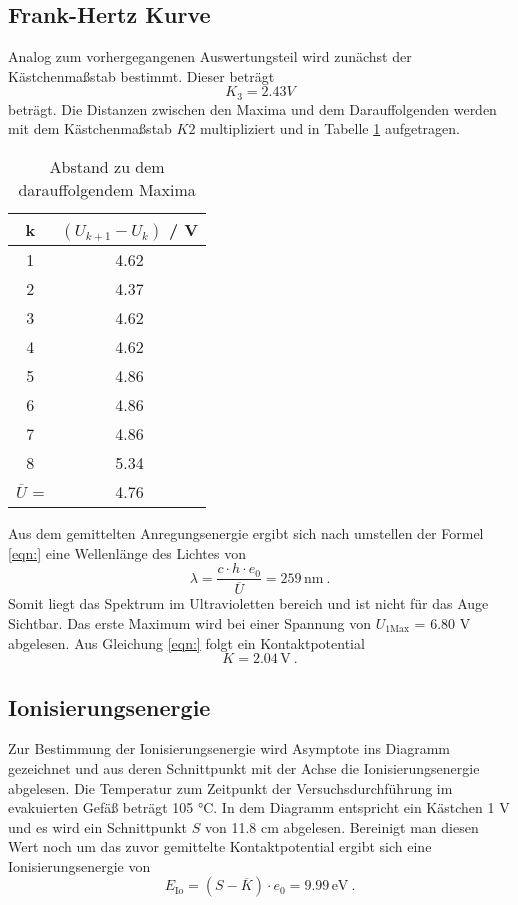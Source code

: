 \subsection{Frank-Hertz Kurve}
Analog zum vorhergegangenen Auswertungsteil wird zunächst der Kästchenmaßstab bestimmt. Dieser beträgt
\begin{equation}
  K_3 = 2.43 V
  \label{eqn:K3}
\end{equation}
beträgt. Die Distanzen zwischen den Maxima und dem Darauffolgenden werden mit dem Kästchenmaßstab $K2$ multipliziert und in Tabelle \ref{tab:Max} aufgetragen.
\begin{table}
  \centering
  \begin{tabular}{c c}
    \toprule
    	k & $(U_{k+1} - U_k)$ / V \\
    \midrule
    	1 & 4.62	\\
    	2 & 4.37	\\
    	3 & 4.62	\\
    	4 & 4.62	\\
    	5 & 4.86	\\
    	6 & 4.86	\\
    	7 & 4.86	\\
    	8 & 5.34	\\
    \midrule
    	$\overline{U}$  = & 4.76 \\
    \bottomrule
  \end{tabular}
  \caption{Abstand zu dem darauffolgendem Maxima}
  \label{tab:Max}
\end{table}
Aus dem gemittelten Anregungsenergie ergibt sich nach umstellen der Formel \ref{eqn:} eine Wellenlänge des Lichtes von
\begin{equation}
  \lambda = \frac{c \cdot h \cdot e_0}{\overline{U}} = 259 \, \text{nm} \ .
  \label{eqn:spek}
\end{equation}
Somit liegt das Spektrum im Ultravioletten bereich und ist nicht für das Auge Sichtbar. Das erste Maximum wird bei einer Spannung von $U_{1 \text{Max}}$ = 6.80 V abgelesen. Aus Gleichung \ref{eqn:} folgt ein Kontaktpotential
\begin{equation}
  K = 2.04 \, \text{V} \ .
  \label{eqn:KonFr}
\end{equation}
\subsection{Ionisierungsenergie}
Zur Bestimmung der Ionisierungsenergie wird Asymptote ins Diagramm gezeichnet und aus deren Schnittpunkt mit der Achse die Ionisierungsenergie abgelesen. Die Temperatur zum Zeitpunkt der Versuchsdurchführung im evakuierten Gefäß beträgt 105 °C. In dem Diagramm entspricht ein Kästchen 1 V und es wird ein Schnittpunkt $S$ von 11.8 cm abgelesen. Bereinigt man diesen Wert noch um das zuvor gemittelte Kontaktpotential ergibt sich eine Ionisierungsenergie von
\begin{equation}
  E_\text{Io} = (S - \overline{K}) \cdot e_0 = 9.99 \, \text{eV} \ .
  \label{eqn:EIo}
\end{equation}
